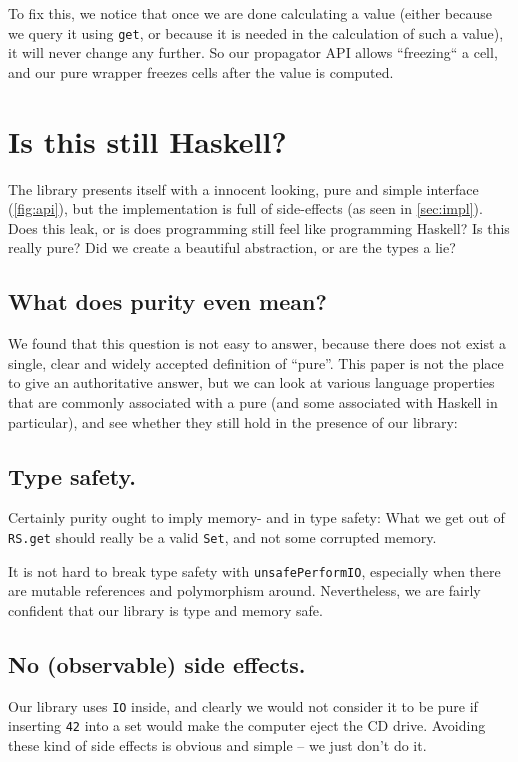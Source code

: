 \documentclass[manuscript,screen,acmsmall]{acmart}
\begin{document}
To fix this, we notice that once we are done calculating a value (either because we query it using \verb|get|, or because it is needed in the calculation of such a value), it will never change any further. So our propagator API allows “freezing“ a cell, and our pure wrapper freezes cells after the value is computed.

\section{Is this still Haskell?}\label{sec:pure}

The library presents itself with a innocent looking, pure and simple interface (\cref{fig:api}), but the implementation is full of side-effects (as seen in \cref{sec:impl}).
Does this leak, or is does programming still feel like programming Haskell?
Is this really pure? Did we create a beautiful abstraction, or are the types a lie?

\subsection{What does purity even mean?}

We found that this question is not easy to answer, because there does not exist a single, clear and widely accepted definition of “pure”.
This paper is not the place to give an authoritative answer, but we can look at various language properties that are commonly associated with a pure  (and some associated with Haskell in particular), and see whether they still hold in the presence of our library:

\subsection{Type safety.}

Certainly purity ought to imply memory- and in type safety: What we get out of \verb|RS.get| should really be a valid \verb|Set|, and not some corrupted memory.

It is not hard to break type safety with \verb|unsafePerformIO|, especially when there are mutable references and polymorphism around. Nevertheless, we are fairly confident that our library is type and memory safe.

\subsection{No (observable) side effects.}

Our library uses \verb|IO| inside, and clearly we would not consider it to be pure if inserting \verb|42| into a set would make the computer eject the CD drive. Avoiding these kind of side effects is obvious and simple -- we just don't do it.
\end{document}
